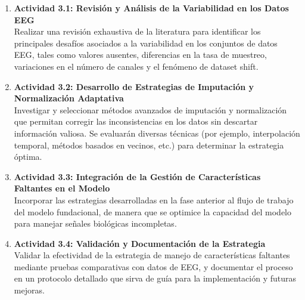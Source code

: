 \begin{enumerate}
	\item \textbf{Actividad 3.1: Revisión y Análisis de la Variabilidad en los Datos EEG}\\
	Realizar una revisión exhaustiva de la literatura para identificar los principales desafíos asociados a la variabilidad en los conjuntos de datos EEG, tales como valores ausentes, diferencias en la tasa de muestreo, variaciones en el número de canales y el fenómeno de dataset shift.
	
	\item \textbf{Actividad 3.2: Desarrollo de Estrategias de Imputación y Normalización Adaptativa}\\
	Investigar y seleccionar métodos avanzados de imputación y normalización que permitan corregir las inconsistencias en los datos sin descartar información valiosa. Se evaluarán diversas técnicas (por ejemplo, interpolación temporal, métodos basados en vecinos, etc.) para determinar la estrategia óptima.
	
	\item \textbf{Actividad 3.3: Integración de la Gestión de Características Faltantes en el Modelo}\\
	Incorporar las estrategias desarrolladas en la fase anterior al flujo de trabajo del modelo fundacional, de manera que se optimice la capacidad del modelo para manejar señales biológicas incompletas.
	
	\item \textbf{Actividad 3.4: Validación y Documentación de la Estrategia}\\
	Validar la efectividad de la estrategia de manejo de características faltantes mediante pruebas comparativas con datos de EEG, y documentar el proceso en un protocolo detallado que sirva de guía para la implementación y futuras mejoras.
\end{enumerate}
